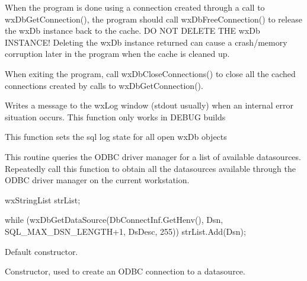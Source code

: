 When the program is done using a connection created through a call to 
wxDbGetConnection(), the program should call wxDbFreeConnection() to release 
the wxDb instance back to the cache.  DO NOT DELETE THE wxDb INSTANCE!  
Deleting the wxDb instance returned can cause a crash/memory corruption 
later in the program when the cache is cleaned up.

When exiting the program, call wxDbCloseConnections() to close all the 
cached connections created by calls to wxDbGetConnection().



Writes a message to the wxLog window (stdout usually) when an internal 
error situation occurs.  This function only works in DEBUG builds




This function sets the sql log state for all open wxDb objects




This routine queries the ODBC driver manager for a list of available 
datasources.  Repeatedly call this function to obtain all the datasources 
available through the ODBC driver manager on the current workstation.

    wxStringList strList;

    while (wxDbGetDataSource(DbConnectInf.GetHenv(), Dsn, SQL\_MAX\_DSN\_LENGTH+1, DsDesc, 255))
        strList.Add(Dsn);



\label{wxdbconstr}


Default constructor.


Constructor, used to create an ODBC connection to a datasource.


